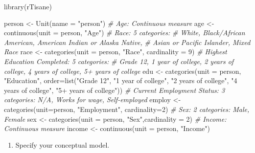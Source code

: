 \documentclass[
]{article}
\newenvironment{Shaded}{\begin{snugshade}}{\end{snugshade}}
\newcommand{\AttributeTok}[1]{\textcolor[rgb]{0.77,0.63,0.00}{#1}}
\newcommand{\CommentTok}[1]{\textcolor[rgb]{0.56,0.35,0.01}{\textit{#1}}}
\newcommand{\DecValTok}[1]{\textcolor[rgb]{0.00,0.00,0.81}{#1}}
\newcommand{\FunctionTok}[1]{\textcolor[rgb]{0.00,0.00,0.00}{#1}}
\newcommand{\NormalTok}[1]{#1}
\newcommand{\OtherTok}[1]{\textcolor[rgb]{0.56,0.35,0.01}{#1}}
\newcommand{\StringTok}[1]{\textcolor[rgb]{0.31,0.60,0.02}{#1}}
\providecommand{\tightlist}{%
  \setlength{\itemsep}{0pt}\setlength{\parskip}{0pt}}
\begin{document}
\begin{Shaded}
\begin{Highlighting}[]
\FunctionTok{library}\NormalTok{(rTisane)}

\NormalTok{person }\OtherTok{\textless{}{-}} \FunctionTok{Unit}\NormalTok{(}\AttributeTok{name =} \StringTok{"person"}\NormalTok{)}
\CommentTok{\# Age: Continuous measure}
\NormalTok{age }\OtherTok{\textless{}{-}} \FunctionTok{continuous}\NormalTok{(}\AttributeTok{unit =}\NormalTok{ person, }\StringTok{"Age"}\NormalTok{)}
\CommentTok{\# Race: 5 categories: }
\CommentTok{\# White, Black/African American, American Indian or Alaska Native, }
\CommentTok{\# Asian or Pacific Islander, Mixed Race}
\NormalTok{race }\OtherTok{\textless{}{-}} \FunctionTok{categories}\NormalTok{(}\AttributeTok{unit =}\NormalTok{ person, }\StringTok{"Race"}\NormalTok{, }\AttributeTok{cardinality =} \DecValTok{9}\NormalTok{)}
\CommentTok{\# Highest Education Completed: 5 categories: }
\CommentTok{\# Grade 12, 1 year of college, 2 years of college, 4 years of college, 5+ years of college}
\NormalTok{edu }\OtherTok{\textless{}{-}} \FunctionTok{categories}\NormalTok{(}\AttributeTok{unit =}\NormalTok{ person, }\StringTok{"Education"}\NormalTok{, }
                  \AttributeTok{order=}\FunctionTok{list}\NormalTok{(}\StringTok{"Grade 12"}\NormalTok{, }\StringTok{"1 year of college"}\NormalTok{, }\StringTok{"2 years of college"}\NormalTok{, }
                             \StringTok{"4 years of college"}\NormalTok{, }\StringTok{"5+ years of college"}\NormalTok{))}
\CommentTok{\# Current Employment Status: 3 categories: N/A, Works for wage, Self{-}employed}
\NormalTok{employ }\OtherTok{\textless{}{-}} \FunctionTok{categories}\NormalTok{(}\AttributeTok{unit=}\NormalTok{person, }\StringTok{"Employment"}\NormalTok{, }\AttributeTok{cardinality=}\DecValTok{2}\NormalTok{)}
\CommentTok{\# Sex: 2 categories: Male, Female}
\NormalTok{sex }\OtherTok{\textless{}{-}} \FunctionTok{categories}\NormalTok{(}\AttributeTok{unit =}\NormalTok{ person, }\StringTok{"Sex"}\NormalTok{,}\AttributeTok{cardinality =} \DecValTok{2}\NormalTok{)}
\CommentTok{\# Income: Continuous measure}
\NormalTok{income }\OtherTok{\textless{}{-}} \FunctionTok{continuous}\NormalTok{(}\AttributeTok{unit =}\NormalTok{ person, }\StringTok{"Income"}\NormalTok{)}
\end{Highlighting}
\end{Shaded}

\begin{enumerate}
\def\labelenumi{\arabic{enumi}.}
\setcounter{enumi}{1}
\tightlist
\item
  Specify your conceptual model.
\end{enumerate}
\end{document}
